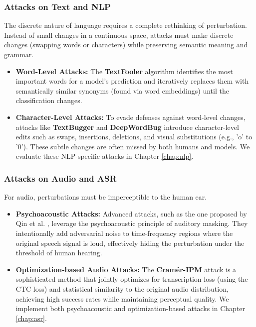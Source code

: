 \documentclass[../main.tex]{subfiles}
\begin{document}
\subsubsection{Attacks on Text and NLP}
The discrete nature of language requires a complete rethinking of perturbation. Instead of small changes in a continuous space, attacks must make discrete changes (swapping words or characters) while preserving semantic meaning and grammar.
\begin{itemize}
    \item \textbf{Word-Level Attacks:} The \textbf{TextFooler} algorithm \cite{jin2019textfooler} identifies the most important words for a model's prediction and iteratively replaces them with semantically similar synonyms (found via word embeddings) until the classification changes.
    \item \textbf{Character-Level Attacks:} To evade defenses against word-level changes, attacks like \textbf{TextBugger} \cite{li2018textbugger} and \textbf{DeepWordBug} \cite{gao2018deepwordbug} introduce character-level edits such as swaps, insertions, deletions, and visual substitutions (e.g., 'o' to '0'). These subtle changes are often missed by both humans and models. We evaluate these NLP-specific attacks in Chapter \ref{chap:nlp}.
\end{itemize}

\subsubsection{Attacks on Audio and ASR}
For audio, perturbations must be imperceptible to the human ear.
\begin{itemize}
    \item \textbf{Psychoacoustic Attacks:} Advanced attacks, such as the one proposed by Qin et al. \cite{qin2019imperceptible}, leverage the psychoacoustic principle of auditory masking. They intentionally add adversarial noise to time-frequency regions where the original speech signal is loud, effectively hiding the perturbation under the threshold of human hearing.
    \item \textbf{Optimization-based Audio Attacks:} The \textbf{Cramér-IPM} attack \cite{esmaeilpour2021towards} is a sophisticated method that jointly optimizes for transcription loss (using the CTC loss) and statistical similarity to the original audio distribution, achieving high success rates while maintaining perceptual quality. We implement both psychoacoustic and optimization-based attacks in Chapter \ref{chap:asr}.
\end{itemize}
\end{document}
